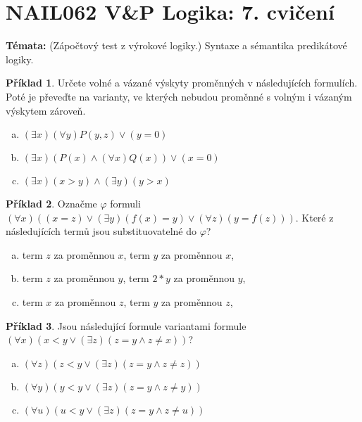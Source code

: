 \documentclass[a4paper]{article}
\theoremstyle{definition}
\newtheorem{problem}{Příklad}
\begin{document}
\section*{NAIL062 V\&P Logika: 7. cvičení}


\textbf{Témata:}
(Zápočtový test z výrokové logiky.) Syntaxe a sémantika predikátové logiky.


\medskip\begin{problem}
    Určete volné a vázané výskyty proměnných v následujících formulích. Poté je převeďte na varianty, ve kterých nebudou proměnné s volným i vázaným výskytem zároveň.
    \begin{enumerate}[(a)]
       \item $(\exists x)(\forall y)P(y,z) \vee (y=0)$
       \item $(\exists x)(P(x) \wedge (\forall x)Q(x)) \vee (x=0)$
       \item $(\exists x)(x>y) \wedge (\exists y)(y>x)$
    \end{enumerate}
    \end{problem}
    
    \medskip\begin{problem}
    Označme $\varphi$ formuli $(\forall x)((x=z) \vee (\exists y)(f(x)=y) \vee (\forall z)(y=f(z)))$. Které z následujících termů jsou substituovatelné do $\varphi$?
    \begin{enumerate}[(a)]
       \item term $z$ za proměnnou $x$, term $y$ za proměnnou $x$,
       \item term $z$ za proměnnou $y$, term $2*y$ za proměnnou $y$,
       \item term $x$ za proměnnou $z$, term $y$ za proměnnou $z$,
    \end{enumerate}
\end{problem}
    
\medskip\begin{problem}
    Jsou následující formule variantami formule $(\forall x)(x<y \vee (\exists z)(z=y \wedge z\ne x))$?
    \begin{enumerate}[(a)]
    \item $(\forall z)(z<y \vee (\exists z)(z=y \wedge z\ne z))$
    \item $(\forall y)(y<y \vee (\exists z)(z=y \wedge z\ne y))$
    \item $(\forall u)(u<y \vee (\exists z)(z=y \wedge z\ne u))$
    \end{enumerate}
\end{problem}
    
\end{document}
